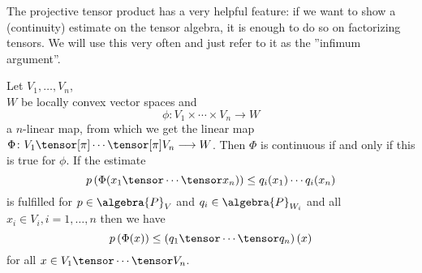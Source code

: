 The projective tensor product has a very helpful feature: if we want to show a 
(continuity) estimate on the tensor algebra, it is enough to do so on 
factorizing tensors. We will use this very often and just refer to it as the 
''infimum argument''.
\begin{lemma}
	\label{LCAna:Lemma:InfimumArgument}
 	Let $V_1, \ldots, V_n$, \hfill  \\
 	$W$ be locally convex vector spaces and 
	\begin{equation*}
		\phi \colon
		V_1 \times \cdots \times V_n
		\longrightarrow
		W
	\end{equation*}
	a $n$-linear map, from which we get the linear map 
	$\Phi \colon V_1 \tensor[\pi] \cdots \tensor[\pi] V_n \longrightarrow W$.
	Then $\Phi$ is continuous if and only if this is true for $\phi$. 
	If the estimate
	\begin{equation}
		\label{LCAna:ContOnFactors}
		p \left(
			\Phi (x_1 \tensor \cdots \tensor x_n)
		\right)
		\leq
		q_i(x_1) \cdots q_i(x_n)
	\end{equation}
	is fulfilled for $p\in\algebra{P}_V$ and $q_i \in \algebra{P}_{W_i}$ 
	and all $x_i \in V_i, i=1, \ldots, n$ then we have
	\begin{equation}
		\label{LCAna:ContGeneral}
		p \left(
			\Phi (x)
		\right)
		\leq
		\left( q_1 \tensor \cdots \tensor q_n \right)(x)
	\end{equation}
	for all $x \in V_1 \tensor \cdots \tensor V_n$.
\end{lemma}
